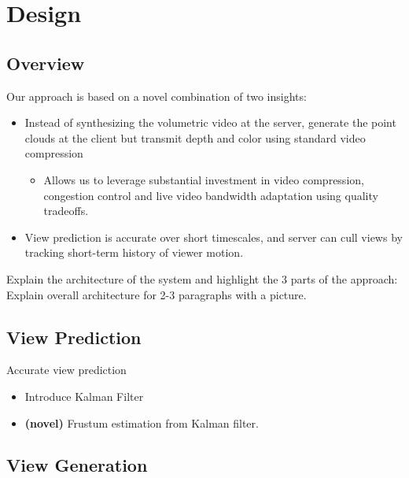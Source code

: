 \section{Design}
\label{s:design}


\subsection{Overview}
\label{ss:overview}


Our approach is based on a novel combination of two insights:
\begin{itemize}
	\item Instead of synthesizing the volumetric video at the server, generate the point clouds at the client but transmit depth and color using standard video compression
	\begin{itemize}
		\item Allows us to leverage substantial investment in video compression, congestion control and live video bandwidth adaptation using quality tradeoffs.
	\end{itemize}

	\item View prediction is accurate over short timescales, and server can cull views by tracking short-term history of viewer motion.
\end{itemize}
	
	
Explain the architecture of the system and highlight the 3 parts of the approach: Explain overall architecture for 2-3 paragraphs with a picture.

\subsection{View Prediction}
\label{ss:view-predicition}
Accurate view prediction

\begin{itemize}
	\item Introduce Kalman Filter
	\item \textbf{(novel)} Frustum estimation from Kalman filter.
\end{itemize}

\subsection{View Generation}
\label{ss:view-generation}
	
